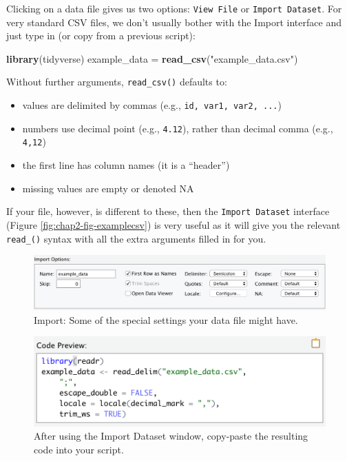 \documentclass[12pt,]{krantz}
\makeatletter
\newenvironment{Shaded}{\begin{snugshade}}{\end{snugshade}}
\newcommand{\KeywordTok}[1]{\textcolor[rgb]{0.13,0.29,0.53}{\textbf{#1}}}
\newcommand{\NormalTok}[1]{#1}
\newcommand{\StringTok}[1]{\textcolor[rgb]{0.31,0.60,0.02}{#1}}
\providecommand{\tightlist}{%
  \setlength{\itemsep}{0pt}\setlength{\parskip}{0pt}}
\newenvironment{kframe}{%
\medskip{}
\setlength{\fboxsep}{.8em}
 \def\at@end@of@kframe{}%
 \ifinner\ifhmode%
  \def\at@end@of@kframe{\end{minipage}}%
  \begin{minipage}{\columnwidth}%
 \fi\fi%
 \def\FrameCommand##1{\hskip\@totalleftmargin \hskip-\fboxsep
 \colorbox{shadecolor}{##1}\hskip-\fboxsep
     \hskip-\linewidth \hskip-\@totalleftmargin \hskip\columnwidth}%
 \MakeFramed {\advance\hsize-\width
   \@totalleftmargin\z@ \linewidth\hsize
   \@setminipage}}%
 {\par\unskip\endMakeFramed%
 \at@end@of@kframe}
\renewenvironment{Shaded}{\begin{kframe}}{\end{kframe}}
\theoremstyle{definition}
\theoremstyle{definition}
\theoremstyle{definition}
\theoremstyle{remark}
\makeatother
\begin{document}
Clicking on a data file gives us two options: \texttt{View\ File} or
\texttt{Import\ Dataset}. For very standard CSV files, we don't usually
bother with the Import interface and just type in (or copy from a
previous script):

\begin{Shaded}
\begin{Highlighting}[]
\KeywordTok{library}\NormalTok{(tidyverse)}
\NormalTok{example_data =}\StringTok{ }\KeywordTok{read_csv}\NormalTok{(}\StringTok{"example_data.csv"}\NormalTok{)}
\end{Highlighting}
\end{Shaded}

Without further arguments, \texttt{read\_csv()} defaults to:

\begin{itemize}
\tightlist
\item
  values are delimited by commas (e.g., \texttt{id,\ var1,\ var2,\ ...})
\item
  numbers use decimal point (e.g., \texttt{4.12}), rather than decimal
  comma (e.g., \texttt{4,12})
\item
  the first line has column names (it is a ``header'')
\item
  missing values are empty or denoted NA
\end{itemize}

If your file, however, is different to these, then the
\texttt{Import\ Dataset} interface (Figure
\ref{fig:chap2-fig-examplecsv}) is very useful as it will give you the
relevant \texttt{read\_()} syntax with all the extra arguments filled in
for you.

\begin{figure}
\includegraphics[width=20.44in]{images/chapter02/import_options} \caption{Import: Some of the special settings your data file might have.}\label{fig:chap02-fig-import-tool}
\end{figure}

\begin{figure}
\includegraphics[width=13.08in]{images/chapter02/code_preview} \caption{After using the Import Dataset window, copy-paste the resulting code into your script.}\label{fig:chap02-fig-import-code}
\end{figure}
\end{document}

